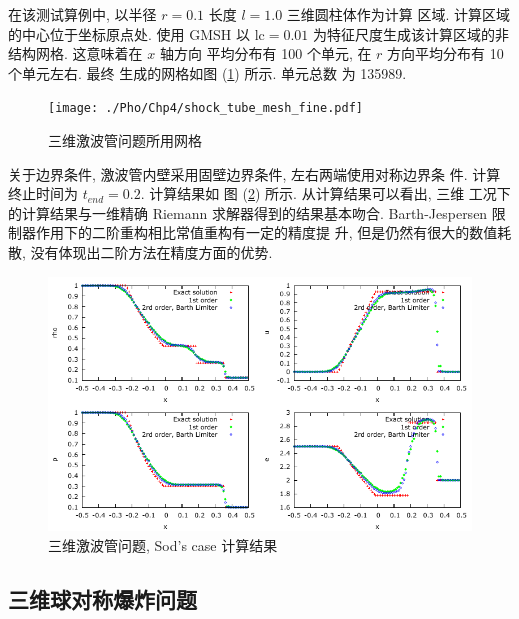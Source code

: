 在该测试算例中, 以半径 $r= 0.1$ 长度 $l = 1.0$ 三维圆柱体作为计算
区域. 计算区域的中心位于坐标原点处. 使用 GMSH 以 $\mbox{lc} =
0.01$ 为特征尺度生成该计算区域的非结构网格. 这意味着在 $x$ 轴方向
平均分布有 100 个单元, 在 $r$ 方向平均分布有 10 个单元左右.  最终
生成的网格如图 (\ref{fig:3d-shock-tube-mesh}) 所示. 单元总数
为 135989.
\begin{figure}[htbp]
  \centering
  \texttt{[image: ./Pho/Chp4/shock\_tube\_mesh\_fine.pdf]}
  \caption{三维激波管问题所用网格}
  \label{fig:3d-shock-tube-mesh}
\end{figure}
关于边界条件, 激波管内壁采用固壁边界条件, 左右两端使用对称边界条
件. 计算终止时间为 $t_{end} = 0.2$. 计算结果如
图 (\ref{fig:sod-test-case-result}) 所示. 从计算结果可以看出, 三维
工况下的计算结果与一维精确 Riemann 求解器得到的结果基本吻合.
Barth-Jespersen 限制器作用下的二阶重构相比常值重构有一定的精度提
升, 但是仍然有很大的数值耗散, 没有体现出二阶方法在精度方面的优势.
\begin{figure}[htbp]
  \centering
  \includegraphics[scale=1.2]{./Pho/Chp4/shock_tube_sod_multiplot.pdf}
  \caption{三维激波管问题, Sod's case 计算结果}
  \label{fig:sod-test-case-result}
\end{figure}

\subsection{三维球对称爆炸问题}
\label{sec:3d-explosion-test-case}

